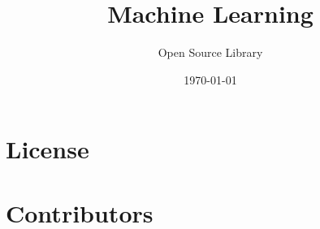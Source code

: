 \documentclass[11pt,a4paper]{book}
\begin{document}
\frontmatter
\title{Machine Learning}
\author{Open Source Library}
\date{\today}
\maketitle

\tableofcontents

\mainmatter{}

\chapter*{License}


\chapter*{Contributors}











\end{document}
